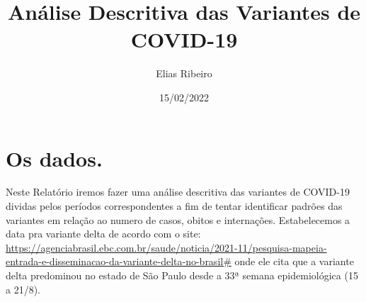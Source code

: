 \documentclass[
]{article}
\title{Análise Descritiva das Variantes de COVID-19}
\author{Elias Ribeiro}
\date{15/02/2022}
\begin{document}
\maketitle

{
\setcounter{tocdepth}{1}
\tableofcontents
}
\newpage

\hypertarget{os-dados.}{%
\section{Os dados.}\label{os-dados.}}

Neste Relatório iremos fazer uma análise descritiva das variantes de
COVID-19 dividas pelos períodos correspondentes a fim de tentar
identificar padrões das variantes em relação ao numero de casos, obitos
e internações. Estabelecemos a data pra variante delta de acordo com o
site:
\url{https://agenciabrasil.ebc.com.br/saude/noticia/2021-11/pesquisa-mapeia-entrada-e-disseminacao-da-variante-delta-no-brasil\#}
onde ele cita que a variante delta predominou no estado de São Paulo
desde a 33ª semana epidemiológica (15 a 21/8).
\end{document}
